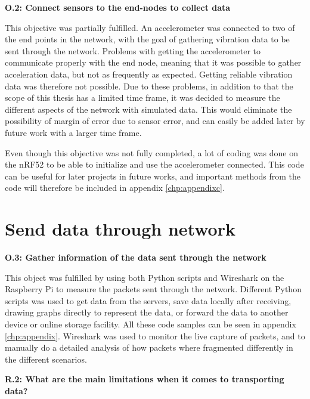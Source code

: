 \noindent\textbf{O.2: Connect sensors to the end-nodes to collect data}

This objective was partially fulfilled. An accelerometer was connected to two of the end points in the network, with the goal of gathering vibration data to be sent through the network. Problems with getting the accelerometer to communicate properly with the end node, meaning that it was possible to gather acceleration data, but not as frequently as expected. Getting reliable vibration data was therefore not possible. Due to these problems, in addition to that the scope of this thesis has a limited time frame, it was decided to measure the different aspects of the network with simulated data. This would eliminate the possibility of margin of error due to sensor error, and can easily be added later by future work with a larger time frame. 

Even though this objective was not fully completed, a lot of coding was done on the nRF52 to be able to initialize and use the accelerometer connected. This code can be useful for later projects in future works, and important methods from the code will therefore be included in appendix \ref{chp:appendixc}.  



\section{Send data through network}

\noindent\textbf{O.3: Gather information of the data sent through the network}

This object was fulfilled by using both Python scripts and Wireshark on the Raspberry Pi to measure the packets sent through the network. Different Python scripts was used to get data from the servers, save data locally after receiving, drawing graphs directly to represent the data, or forward the data to another device or online storage facility. All these code samples can be seen in appendix \ref{chp:appendix}. Wireshark was used to monitor the live capture of packets, and to manually do a detailed analysis of how packets where fragmented differently in the different scenarios. 

\noindent\textbf{R.2: What are the main limitations when it comes to transporting data?}

